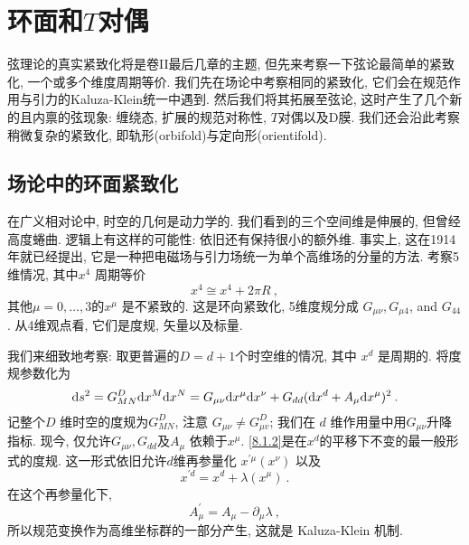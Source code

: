
\chapter{\texorpdfstring{环面和$T$对偶}{环面和T对偶}} \label{cha:8}
弦理论的真实紧致化将是卷II最后几章的主题, 但先来考察一下弦论最简单的紧致化, 一个或多个维度周期等价. 
我们先在场论中考察相同的紧致化, 它们会在规范作用与引力的Kaluza-Klein统一中遇到. 然后我们将其拓展至弦论, 这时产生了几个新的且内禀的弦现象: 
缠绕态, 扩展的规范对称性, $T$对偶以及D膜. 我们还会沿此考察稍微复杂的紧致化, 即轨形(orbifold)与定向形(orientifold).

\section{场论中的环面紧致化} \label{sec:8.1}

在广义相对论中, 时空的几何是动力学的. 我们看到的三个空间维是伸展的, 但曾经高度蜷曲. 逻辑上有这样的可能性: 依旧还有保持很小的额外维. 
事实上, 这在1914年就已经提出, 它是一种把电磁场与引力场统一为单个高维场的分量的方法. 考察5维情况, 其中$x^{4}$ 周期等价
\begin{equation}
	x^{4} \cong x^{4}+2 \pi R \:, \label{8.1.1}
\end{equation}
其他$\mu=0,\ldots,3$的$x^{\mu}$ 是不紧致的. 这是环向紧致化, 5维度规分成 $G_{\mu \nu}, G_{\mu 4}$, and $G_{44} $. 从4维观点看, 它们是度规, 矢量以及标量.


我们来细致地考察: 取更普遍的$D=d+1$个时空维的情况, 其中 $x^{d}$ 是周期的. 将度规参数化为
\begin{equation}
	\mathrm{d} s^{2}=G_{M N}^{D} \mathrm{d} x^{M} \mathrm{d} x^{N}=G_{\mu \nu} \mathrm{d} x^{\mu} \mathrm{d} x^{\nu}+G_{d d}(\mathrm{d} x^{d}+A_{\mu} \mathrm{d} x^{\mu})^{2} \:.
	\label{8.1.2}
\end{equation}
记整个$D$ 维时空的度规为$G_{M N}^{D} $, 注意 $G_{\mu \nu} \neq G_{\mu v}^{D} $; 我们在 $d$ 维作用量中用$G_{\mu \nu} $升降指标. 
现今, 仅允许$G_{\mu \nu}, G_{d d}$及$A_{\mu}$ 依赖于$x^{\mu}$.  \eqref{8.1.2}是在$x^{d}$的平移下不变的最一般形式的度规. 
这一形式依旧允许$d$维再参量化 $x^{\prime \mu}(x^{\nu})$ 以及
\begin{equation}
	x^{\prime d}=x^{d}+\lambda(x^{\mu}) \:. \label{8.1.3}
\end{equation}
在这个再参量化下,
\begin{equation}
	A_{\mu}^{\prime}=A_{\mu}-\partial_{\mu} \lambda \:, \label{8.1.4}
\end{equation}
所以规范变换作为高维坐标群的一部分产生, 这就是 Kaluza-Klein 机制.

